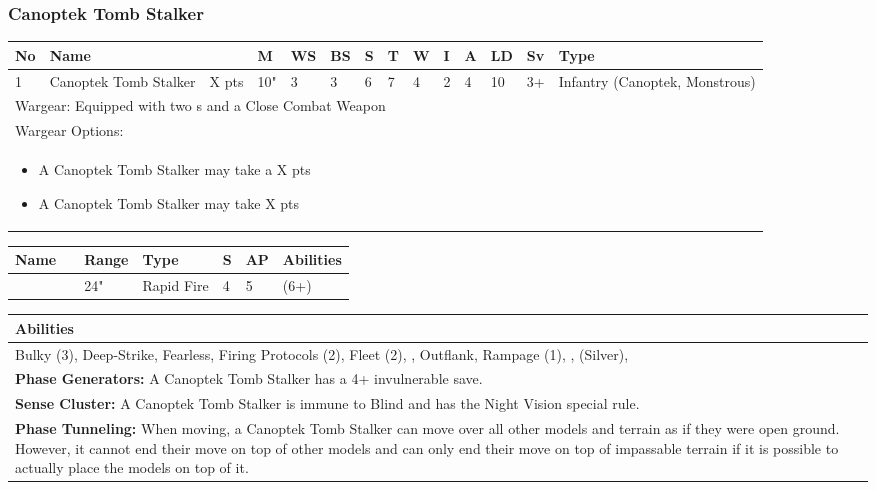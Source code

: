 \newpage
\subsubsection{Canoptek Tomb Stalker}

\noindent
\begin{tabular}{||m{10pt} m{115pt} m{30pt} m{11pt} m{11pt} m{11pt} m{11pt} m{11pt} m{11pt} m{11pt} m{11pt} m{11pt} m{11pt} m{105pt}||}
	\hline
	No & Name & & M & WS & BS & S & T & W & I & A & LD & Sv & Type \\
	\hline
	1 & Canoptek Tomb Stalker & X pts & 10" & 3 & 3 & 6 & 7 & 4 & 2 & 4 & 10 & 3+ & Infantry (Canoptek, Monstrous)\\
	\hline
	\hline
	\multicolumn{14}{||Z{532 pt}||}{Wargear: Equipped with two \quickref{Gauss Flayer}s and a Close Combat Weapon}\\
	\multicolumn{14}{||Z{532 pt}||}{Wargear Options:} \\	\multicolumn{14}{||Z{532 pt}||}{\begin{itemize}
			\item A Canoptek Tomb Stalker may take a \quickref{Gloom Prism} \hrulefill X pts
			\item A Canoptek Tomb Stalker may take \quickref{Sepulchral Scarabs} \hrulefill X pts
	\end{itemize}} \\
	\hline
\end{tabular}

\noindent
\begin{tabular}{||m{110pt} m{30pt} m{31pt} m{55pt} m{12pt} m{12pt} m{210pt}||}
	\hline
	Name & & Range & Type & S & AP & Abilities \\
	\hline
	\quickref{Gauss Flayer} & & 24" & Rapid Fire & 4 & 5 & \quickref{Gauss} (6+) \\
	\hline
\end{tabular}

\noindent
\begin{tabular}{||m{532pt}||}
	\hline
	Abilities \\
	\hline
	Bulky (3), Deep-Strike, Fearless, Firing Protocols (2), Fleet (2), \quickref{Living Metal}, Outflank, Rampage (1), \quickref{Reanimation Protocols}, \quickref{Soulless Hordes} (Silver), \quickref{Tomb Guardians} \\
	\textbf{Phase Generators:} A Canoptek Tomb Stalker has a 4+ invulnerable save. \\
	\textbf{Sense Cluster:} A Canoptek Tomb Stalker is immune to Blind and has the Night Vision special rule. \\
	\textbf{Phase Tunneling:} When moving, a Canoptek Tomb Stalker can move over all other models and terrain as if they were open ground. However, it cannot end their move on top of other models and can only end their move on top of impassable terrain if it is possible to actually place the models on top of it. \\
	\hline
\end{tabular}




